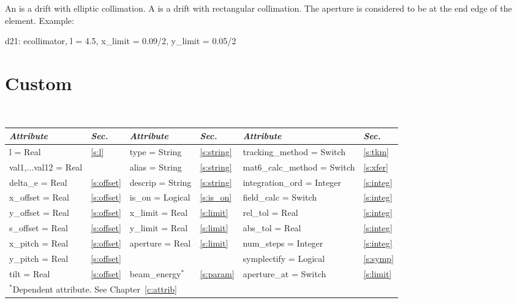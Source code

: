 An  is a drift with elliptic collimation.
A  is a drift with rectangular collimation.
The aperture is considered to be at the end edge of the element.
Example:
\begin{example}
  d21: ecollimator, l = 4.5, x_limit = 0.09/2, y_limit = 0.05/2
\end{example}

\section{Custom}
\label{s:custom}

\begin{center}
\tt
\begin{tabular}{|l|l||l|l||l|l|} \hline
  {\sl Attribute} & {\sl Sec.}  & {\sl Attribute} & {\sl Sec.}  & {\sl Attribute} & {\sl Sec.} \\ \hline
  l        = Real           & \ref{s:l}      & type = String    & \ref{s:string} & tracking\_method = Switch   & \ref{s:tkm}   \\ \hline
  val1,$\ldots$val12 = Real &                & alias = String   & \ref{s:string} & mat6\_calc\_method = Switch & \ref{s:xfer}  \\ \hline
  delta\_e   = Real         & \ref{s:offset} & descrip = String & \ref{s:string} & integration\_ord = Integer  & \ref{s:integ} \\ \hline
  x\_offset  = Real         & \ref{s:offset} & is\_on = Logical & \ref{s:is_on}  & field\_calc = Switch        & \ref{s:integ} \\ \hline
  y\_offset  = Real         & \ref{s:offset} & x\_limit = Real  & \ref{s:limit}  & rel\_tol = Real             & \ref{s:integ} \\ \hline
  s\_offset  = Real         & \ref{s:offset} & y\_limit = Real  & \ref{s:limit}  & abs\_tol = Real             & \ref{s:integ} \\ \hline
  x\_pitch = Real           & \ref{s:offset} & aperture = Real  & \ref{s:limit}  & num\_steps = Integer        & \ref{s:integ} \\ \hline
  y\_pitch = Real           & \ref{s:offset} &                  &                & symplectify = Logical       & \ref{s:symp}  \\ \hline
  tilt     = Real           & \ref{s:offset} & beam\_energy$^*$ & \ref{s:param}  & aperture\_at = Switch       & \ref{s:limit} \\ \hline
  \multicolumn{6}{l}{\small $^*$Dependent attribute. See Chapter~\ref{c:attrib}} \\
\end{tabular}
\end{center}
\toffset


